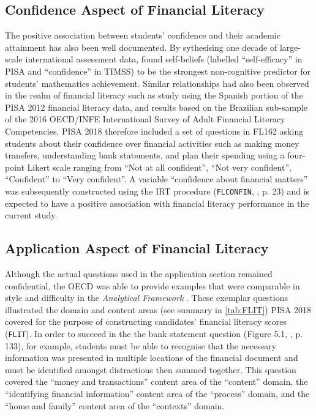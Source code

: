 \documentclass[a4paper,11pt,UKenglish,twoside,openright]{report}\usepackage[]{graphicx}\usepackage[]{color}
\begin{document}
\subsection{Confidence Aspect of Financial Literacy}

The positive association between students' confidence and their academic attainment has also been well documented. By sythesising one decade of large-scale international assessment data, \textcite{lee:2018} found self-beliefs (labelled ``self-efficacy'' in PISA and ``confidence'' in TIMSS) to be the strongest non-cognitive predictor for students' mathematics achievement. Similar relationships had also been observed in the realm of financial literacy such as  study using the Spanish portion of the PISA 2012 financial literacy data, and  results based on the Brazilian sub-sample of the 2016 OECD/INFE International Survey of Adult Financial Literacy Competencies. PISA 2018 therefore included a set of questions in \textsf{FL162} asking students about their confidence over financial activities such as making money transfers, understanding bank statements, and plan their spending using a four-point Likert scale ranging from ``Not at all confident'', ``Not very confident'', ``Confident'' to ``Very confident''. A variable ``confidence about financial matters'' was subsequently constructed using the IRT procedure (\texttt{FLCONFIN}, \textcite{PISAtech}, p. 23) and is expected to have a positive association with financial literacy performance in the current study.

\subsection{Application Aspect of Financial Literacy}



Although the actual questions used in the application section remained confidential, the OECD was able to provide examples that were comparable in style and difficulty in the \textit{Analytical Framework} \parencite[][pp. 133--148]{PISAframework}. These exemplar questions illustrated the domain and content areas (see summary in \cref{tab:FLIT}) PISA 2018 covered for the purpose of constructing candidates' financial literacy scores (\texttt{FLIT}). In order to succeed in the the bank statement question (Figure 5.1, \textcite{PISAframework}, p. 133), for example, students must be able to recognise that the necessary information was presented in multiple locations of the financial document and must be identified amongst distractions then summed together. This question covered the ``money and transactions'' content area of the ``content'' domain, the ``identifying financial information'' content area of the ``process'' domain, and the ``home and family'' content area of the ``contexts'' domain.
\end{document}
